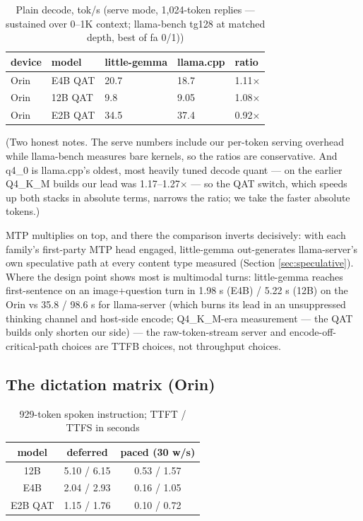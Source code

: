 \documentclass{article}
\begin{document}
\begin{table}[H]
	\centering
	\begin{tabularx}{\textwidth}{l X X X X}
		\toprule
		device & model  & little-gemma  & llama.cpp & ratio\\
		\midrule
		Orin & E4B QAT & 20.7 & 18.7 & 1.11×\\
		Orin & 12B QAT & 9.8 & 9.05 & 1.08×\\
        Orin & E2B QAT & 34.5 & 37.4 & 0.92×\\
		\bottomrule
	\end{tabularx}
	\caption{Plain decode, tok/s (serve mode, 1,024-token replies — sustained over 0–1K context; llama-bench tg128 at matched depth, best of fa 0/1))}
	\label{tab:plain-decode}
\end{table}

(Two honest notes. The serve numbers include our per-token serving overhead while llama-bench measures bare kernels, so the ratios are conservative. And q4\_0 is llama.cpp's oldest, most heavily tuned decode quant — on the earlier Q4\_K\_M builds our lead was 1.17–1.27× — so the QAT switch, which speeds up both stacks in absolute terms, narrows the ratio; we take the faster absolute tokens.)

MTP multiplies on top, and there the comparison inverts decisively: with each family's first-party MTP head engaged, little-gemma out-generates llama-server's own speculative path at every content type measured (Section \ref{sec:speculative}). Where the design point shows most is multimodal turns: little-gemma reaches first-sentence on an image+question turn in 1.98 s (E4B) / 5.22 s (12B) on the Orin vs 35.8 / 98.6 s for llama-server (which burns its lead in an unsuppressed thinking channel and host-side encode; Q4\_K\_M-era measurement — the QAT builds only shorten our side) — the raw-token-stream server and encode-off-critical-path choices are TTFB choices, not throughput choices.

\subsection{The dictation matrix (Orin)}
\label{sec:dictmatrix}

\begin{table}[H]
	\centering
	\begin{tabular}{ccc}
		\toprule
		model & deferred & paced (30 w/s) \\
		\midrule
		12B & 5.10 / 6.15 & 0.53 / 1.57 \\
		E4B & 2.04 / 2.93 & 0.16 / 1.05 \\
		E2B QAT & 1.15 / 1.76 & 0.10 / 0.72\\
		\bottomrule
	\end{tabular}
	\caption{929-token spoken instruction; TTFT / TTFS in seconds}
	\label{tab:929-token}
\end{table}
\end{document}
